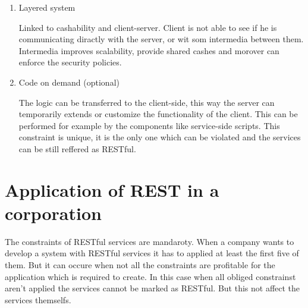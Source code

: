 \begin{description}
\begin{enumerate}
\item Layered system

Linked to cashability and client-server. Client is not able to see if he is communicating diractly with the server, or wit som intermedia between them. Intermedia improves scalability, provide shared cashes and morover can enforce the security policies.

\item Code on demand (optional)

The logic can be transferred to the client-side, this way the server can temporarily extends or customize the functionality of the client. This can be performed for example by the components like service-side scripts.
This constraint is unique, it is the only one which can be violated and the services can be still reffered as RESTful.

\end{enumerate}
\end{description}

\section{Application of REST in a corporation}
The constraints of RESTful services are mandaroty. When a company wants to develop a system with RESTful services it has to applied at least the first five of them. But it can occure when not all the constraints are profitable for the application which is required to create. In this case when all obliged constrainst aren't applied the services cannot be marked as RESTful. But this not affect the services themselfs.


